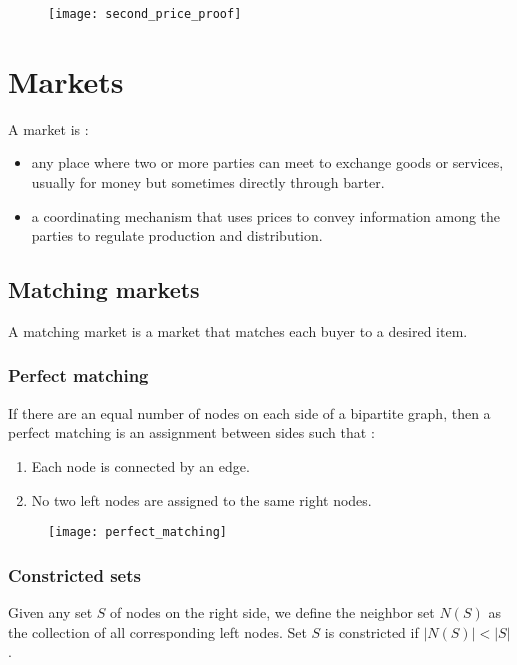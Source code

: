 \begin{figure}[H]
    \centering
    \texttt{[image: second\_price\_proof]}
\end{figure}

\chapter{Markets}

A market is :
\begin{itemize}
\item any place where two or more parties can meet to exchange goods or services, usually for money but sometimes directly through barter.
\item a coordinating mechanism that uses prices to convey information among the parties to regulate production and distribution.
\end{itemize}

\section{Matching markets}

A matching market is a market that matches each buyer to a desired item.

\subsection{Perfect matching}

If there are an equal number of nodes on each side of a bipartite graph, then a perfect matching is an assignment between sides such that :
\begin{enumerate}
\item Each node is connected by an edge.
\item No two left nodes are assigned to the same right nodes.
\end{enumerate}

\begin{figure}[H]
    \centering
    \texttt{[image: perfect\_matching]}
\end{figure}

\subsection{Constricted sets}

Given any set $S$ of nodes on the right side, we define the neighbor set $N(S)$ as the collection of all corresponding left nodes. Set $S$ is constricted if $|N(S)| < |S|$.

